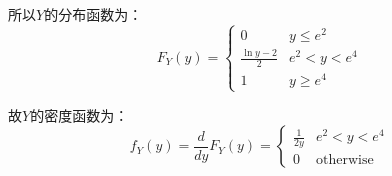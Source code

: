 \documentclass[a4paper,12pt]{ctexart}
\begin{document}
所以$Y$的分布函数为：
\begin{equation*}
	F_Y(y) = 
	\begin{cases}
		0 & y \leq e^2 \\
		\frac{\ln y - 2}{2} & e^2 < y < e^4 \\
		1 & y \geq e^4
	\end{cases}
\end{equation*}

故$Y$的密度函数为：
\begin{equation*}
	f_Y(y) = \frac{d}{dy}F_Y(y) =
	\begin{cases}
		\frac{1}{2y} & e^2 < y < e^4 \\
		0 & \text{otherwise}
	\end{cases}
\end{equation*}
\end{document}
